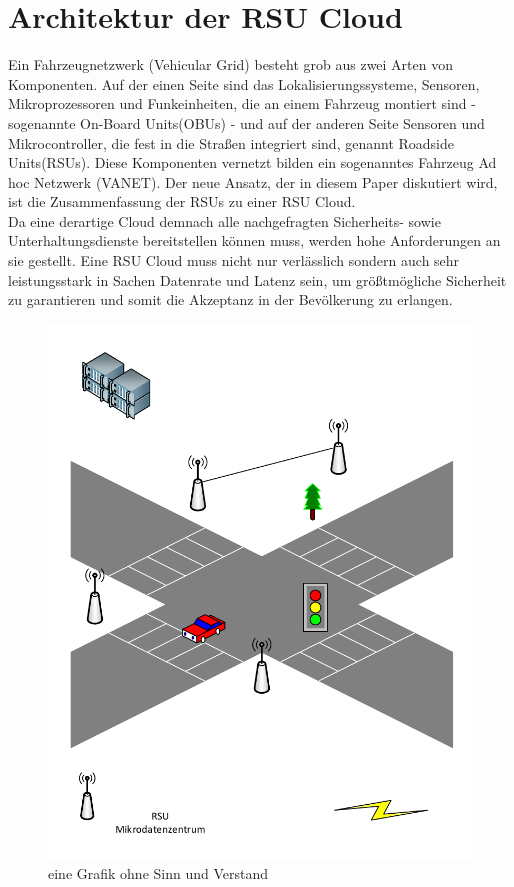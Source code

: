 \documentclass[conference]{IEEEtran}
\begin{document}
\section{Architektur der RSU Cloud}

Ein Fahrzeugnetzwerk (Vehicular Grid) besteht grob aus zwei Arten von Komponenten. Auf der einen Seite sind das Lokalisierungssysteme, Sensoren, Mikroprozessoren und Funkeinheiten, die an einem Fahrzeug montiert sind - sogenannte On-Board Units(OBUs) - und auf der anderen Seite  Sensoren und Mikrocontroller, die fest in die Straßen integriert sind, genannt Roadside Units(RSUs). Diese Komponenten vernetzt bilden ein sogenanntes Fahrzeug Ad hoc Netzwerk (VANET).  Der neue Ansatz, der in diesem Paper diskutiert wird, ist die Zusammenfassung der RSUs zu einer RSU Cloud.\\
Da eine derartige Cloud demnach alle nachgefragten Sicherheits- sowie Unterhaltungsdienste bereitstellen können muss, werden hohe Anforderungen an sie gestellt. Eine RSU Cloud muss nicht nur verlässlich sondern auch sehr leistungsstark in Sachen Datenrate und Latenz sein, um größtmögliche Sicherheit zu garantieren und somit die Akzeptanz in der Bevölkerung zu erlangen.\\

\begin{figure}
	\centering
	\includegraphics[scale=0.6]{strasse.pdf}
	\caption{eine Grafik ohne Sinn und Verstand}
	\label{img:grafik-dummy}
\end{figure}
\end{document}
